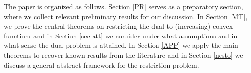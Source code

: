 \documentclass[reqno, a4paper]{amsart}
\newcommand{\lc}{\preceq_{\textnormal{c}}}
\newcommand{\lic}{\preceq_{icx}}
\newtheorem{theorem}{Theorem}[section]
\newcommand{\PP}{\mathcal{P}}
\newcommand{\R}{\mathbb R}
\theoremstyle{definition}
\theoremstyle{definition}
\theoremstyle{definition}
\newtheorem{remark}[theorem]{Remark}
\begin{document}






The paper is organized as follows. Section \ref{PR} serves as a preparatory section, where we collect relevant preliminary results for our discussion. In Section \ref{MT}, we prove the central theorems on restricting the dual to (increasing) convex functions and in Section \ref{sec att} we consider under what assumptions and in what sense the dual problem is attained.  In Section \ref{APP} we apply the main theorems to recover known results from the literature and in Section \ref{nesto} we discuss a general abstract framework for the restriction problem. 
\end{document}
